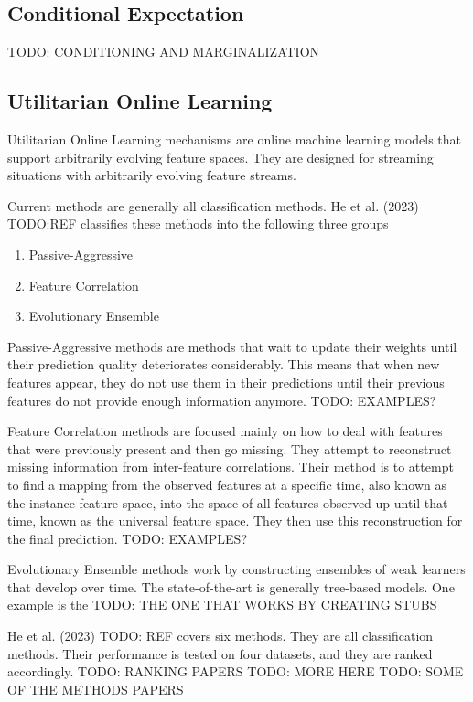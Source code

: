 \subsection{Conditional Expectation}
TODO: CONDITIONING AND MARGINALIZATION

\subsection{Utilitarian Online Learning}

Utilitarian Online Learning mechanisms are online machine learning models that
support arbitrarily evolving feature spaces. They are designed for streaming
situations with arbitrarily evolving feature streams. 

Current methods are generally all classification methods. He et al. (2023)
TODO:REF classifies these methods into the following three groups

\begin{enumerate}
    \item Passive-Aggressive
    \item Feature Correlation
    \item Evolutionary Ensemble
\end{enumerate}

Passive-Aggressive methods are methods that wait to update their weights until
their prediction quality deteriorates considerably. This means that when new
features appear, they do not use them in their predictions until their previous
features do not provide enough information anymore. TODO: EXAMPLES?

Feature Correlation methods are focused mainly on how to deal with features
that were previously present and then go missing. They attempt to reconstruct
missing information from inter-feature correlations. Their method is to attempt
to find a mapping from the observed features at a specific time, also known as
the instance feature space, into the space of all features observed up until
that time, known as the universal feature space. They then use this
reconstruction for the final prediction. TODO: EXAMPLES?

Evolutionary Ensemble methods work by constructing ensembles of weak learners
that develop over time. The state-of-the-art is generally tree-based models.
One example is the TODO: THE ONE THAT WORKS BY CREATING STUBS

He et al. (2023) TODO: REF covers six methods. They are all classification
methods. Their performance is tested on four datasets, and they are ranked
accordingly. TODO: RANKING PAPERS TODO: MORE HERE TODO: SOME OF THE METHODS
PAPERS

